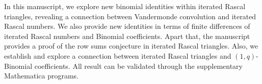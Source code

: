 In this manuscript, we explore new binomial identities within iterated Rascal triangles,
revealing a connection between Vandermonde convolution and iterated Rascal numbers.
We also provide new identities in terms of finite differences of iterated Rascal numbers and Binomial coefficients.
Apart that, the manuscript provides a proof of the row sums conjecture in iterated Rascal triangles.
Also, we establish and explore a connection between iterated Rascal triangles and $(1,q)$-Binomial coefficients.
All result can be validated through the supplementary Mathematica programs.

